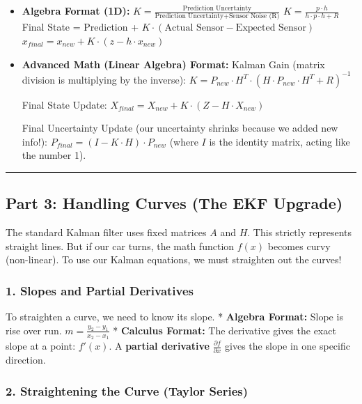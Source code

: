 \documentclass[
]{article}
\begin{document}
\begin{itemize}
\item
  \textbf{Algebra Format (1D):}
  \(K = \frac{\text{Prediction Uncertainty}}{\text{Prediction Uncertainty} + \text{Sensor Noise (R)}}\)
  \(K = \frac{p \cdot h}{h \cdot p \cdot h + R}\) Final State =
  Prediction +
  \(K \cdot (\text{Actual Sensor} - \text{Expected Sensor})\)
  \(x_{final} = x_{new} + K \cdot (z - h \cdot x_{new})\)
\item
  \textbf{Advanced Math (Linear Algebra) Format:} Kalman Gain (matrix
  division is multiplying by the inverse):
  \(K = P_{new} \cdot H^T \cdot (H \cdot P_{new} \cdot H^T + R)^{-1}\)

  Final State Update:
  \(X_{final} = X_{new} + K \cdot (Z - H \cdot X_{new})\)

  Final Uncertainty Update (our uncertainty shrinks because we added new
  info!): \(P_{final} = (I - K \cdot H) \cdot P_{new}\) (where \(I\) is
  the identity matrix, acting like the number 1).
\end{itemize}

\begin{center}\rule{0.5\linewidth}{0.5pt}\end{center}

\subsection{Part 3: Handling Curves (The EKF
Upgrade)}\label{part-3-handling-curves-the-ekf-upgrade}

The standard Kalman filter uses fixed matrices \(A\) and \(H\). This
strictly represents straight lines. But if our car turns, the math
function \(f(x)\) becomes curvy (non-linear). To use our Kalman
equations, we must straighten out the curves!

\subsubsection{1. Slopes and Partial
Derivatives}\label{slopes-and-partial-derivatives}

To straighten a curve, we need to know its slope. * \textbf{Algebra
Format:} Slope is rise over run. \(m = \frac{y_2 - y_1}{x_2 - x_1}\) *
\textbf{Calculus Format:} The derivative gives the exact slope at a
point: \(f'(x)\). A \textbf{partial derivative}
\(\frac{\partial f}{\partial x}\) gives the slope in one specific
direction.

\subsubsection{2. Straightening the Curve (Taylor
Series)}\label{straightening-the-curve-taylor-series}
\end{document}
